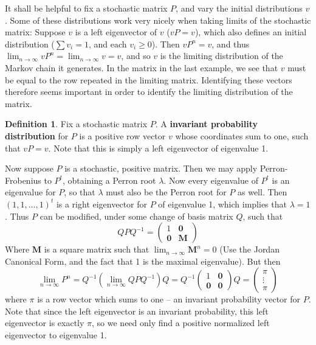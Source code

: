 \documentclass[12pt]{report}
\theoremstyle{plain}
\theoremstyle{definition}
\newtheorem*{defi}{Definition}
\newenvironment{definition}
    {\begin{samepage}\begin{framed}\begin{defi}}
    {\end{defi}\end{framed}\end{samepage}}
\begin{document}
It shall be helpful to fix a stochastic matrix $P$, and vary the initial distributions $v$. Some of these distributions work very nicely when taking limits of the stochastic matrix: Suppose $v$ is a left eigenvector of $v$ ($vP = v$), which also defines an initial distribution ($\sum v_i = 1$, and each $v_i \geq 0$). Then $vP^n = v$, and thus $\lim_{n \to \infty} vP^n = \lim_{n \to \infty} v = v$, and so $v$ is the limiting distribution of the Markov chain it generates. In the matrix in the last example, we see that $v$ must be equal to the row repeated in the limiting matrix. Identifying these vectors therefore seems important in order to identify the limiting distribution of the matrix.

\begin{definition}
    Fix a stochastic matrix $P$. A {\bf invariant probability distribution} for $P$ is a positive row vector $v$ whose coordinates sum to one, such that $vP = v$. Note that this is simply a left eigenvector of eigenvalue 1.
\end{definition}

Now suppose $P$ is a stochastic, positive matrix. Then we may apply Perron-Frobenius to $P^t$, obtaining a Perron root $\lambda$. Now every eigenvalue of $P^t$ is an eigenvalue for $P$, so that $\lambda$ must also be the Perron root for $P$ as well. Then $(1,1,\dots,1)^t$ is a right eigenvector for $P$ of eigenvalue 1, which implies that $\lambda = 1$. Thus $P$ can be modified, under some change of basis matrix $Q$, such that
%
\[ QPQ^{-1} = \begin{pmatrix} 1 & \mathbf{0} \\ \mathbf{0} & \mathbf{M} \end{pmatrix} \]
%
Where $\mathbf{M}$ is a square matrix such that $\lim_{n \to \infty} \mathbf{M}^n = 0$ (Use the Jordan Canonical Form, and the fact that 1 is the maximal eigenvalue). But then
%
\[ \lim_{n \to \infty} P^n = Q^{-1} (\lim_{n \to \infty} QPQ^{-1}) Q = Q^{-1} \begin{pmatrix} 1 & \mathbf{0} \\ \mathbf{0} & \mathbf{0} \end{pmatrix} Q = \begin{pmatrix} \pi \\ \vdots \\ \pi \end{pmatrix} \]
%
where $\pi$ is a row vector which sums to one -- an invariant probability vector for $P$. Note that since the left eigenvector is an invariant probability, this left eigenvector is exactly $\pi$, so we need only find a positive normalized left eigenvector to eigenvalue 1.
\end{document}
